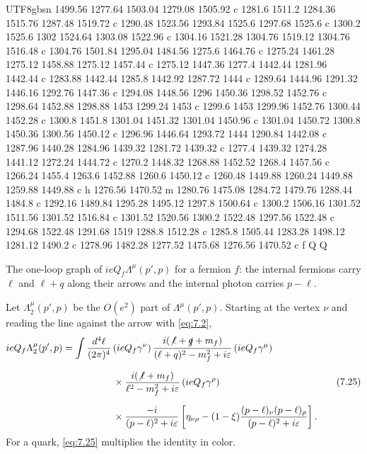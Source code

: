 \documentclass[11pt,a4paper,oneside]{report}
\begin{document}
\begin{CJK*}{UTF8}{gbsn}
{1499.56 1277.64 1503.04 1279.08 1505.92 c 1281.6 1511.2 1284.36 1515.76 1287.48 1519.72 c 1290.48 1523.56
1293.84 1525.6 1297.68 1525.6 c 1300.2 1525.6 1302 1524.64 1303.08 1522.96 c 1304.16 1521.28 1304.76
1519.12 1304.76 1516.48 c 1304.76 1501.84 1295.04 1484.56 1275.6 1464.76 c 1275.24 1461.28 1275.12
1458.88 1275.12 1457.44 c 1275.12 1447.36 1277.4 1442.44 1281.96 1442.44 c 1283.88 1442.44 1285.8 1442.92
1287.72 1444 c 1289.64 1444.96 1291.32 1446.16 1292.76 1447.36 c 1294.08 1448.56 1296 1450.36 1298.52
1452.76 c 1298.64 1452.88 1298.88 1453 1299.24 1453 c 1299.6 1453 1299.96 1452.76 1300.44 1452.28 c
1300.8 1451.8 1301.04 1451.32 1301.04 1450.96 c 1301.04 1450.72 1300.8 1450.36 1300.56 1450.12 c 1296.96
1446.64 1293.72 1444 1290.84 1442.08 c 1287.96 1440.28 1284.96 1439.32 1281.72 1439.32 c 1277.4 1439.32
1274.28 1441.12 1272.24 1444.72 c 1270.2 1448.32 1268.88 1452.52 1268.4 1457.56 c 1266.24 1455.4 1263.6
1452.88 1260.6 1450.12 c 1260.48 1449.88 1260.24 1449.88 1259.88 1449.88 c h 1276.56 1470.52 m 1280.76
1475.08 1284.72 1479.76 1288.44 1484.8 c 1292.16 1489.84 1295.28 1495.12 1297.8 1500.64 c 1300.2 1506.16
1301.52 1511.56 1301.52 1516.84 c 1301.52 1520.56 1300.2 1522.48 1297.56 1522.48 c 1294.68 1522.48
1291.68 1519 1288.8 1512.28 c 1285.8 1505.44 1283.28 1498.12 1281.12 1490.2 c 1278.96 1482.28 1277.52
1475.68 1276.56 1470.52 c f Q Q
}

The one-loop graph of $ieQ_f\Lambda^\mu(p',p)$ for a fermion $f$: the internal fermions carry $\ell$ and $\ell+q$ along their arrows and the internal photon carries $p-\ell$.

Let $\Lambda_2^\mu(p',p)$ be the $O(e^2)$ part of $\Lambda^\mu(p',p)$. Starting at the vertex $\nu$ and reading the line against the arrow with \eqref{eq:7.2},
\begin{equation*}
\begin{aligned}
ieQ_f\Lambda_2^\mu(p',p)
=\int\frac{d^4\ell}{(2\pi)^4}\,
&(ieQ_f\gamma^\nu)\,\frac{i(\not\ell+\slashed{q}+m_f)}{(\ell+q)^2-m_f^2+i\varepsilon}\,(ieQ_f\gamma^\mu)\\[6pt]
&\times\frac{i(\not\ell+m_f)}{\ell^2-m_f^2+i\varepsilon}\,(ieQ_f\gamma^\rho)\\[6pt]
&\times\frac{-i}{(p-\ell)^2+i\varepsilon}\left[\eta_{\nu\rho}-(1-\xi)\frac{(p-\ell)_\nu(p-\ell)_\rho}{(p-\ell)^2+i\varepsilon}\right].
\end{aligned}
\tag{7.25}\label{eq:7.25}
\end{equation*}
For a quark, \eqref{eq:7.25} multiplies the identity in color.


\end{CJK*}
\end{document}
